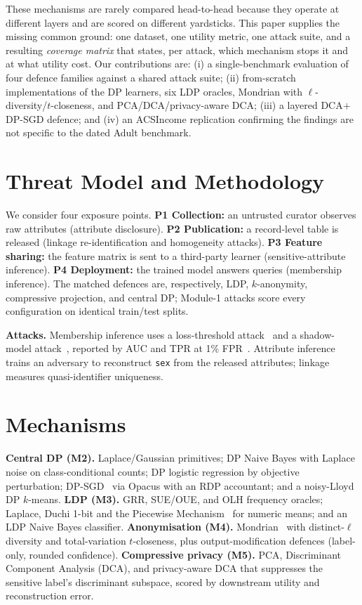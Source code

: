 \documentclass[conference]{IEEEtran}
\begin{document}
These mechanisms are rarely compared head-to-head because they operate at
different layers and are scored on different yardsticks. This paper supplies the
missing common ground: one dataset, one utility metric, one attack suite, and a
resulting \emph{coverage matrix} that states, per attack, which mechanism stops
it and at what utility cost. Our contributions are: (i) a single-benchmark
evaluation of four defence families against a shared attack suite; (ii) from-scratch
implementations of the DP learners, six LDP oracles, Mondrian with
$\ell$-diversity/$t$-closeness, and PCA/DCA/privacy-aware DCA; (iii) a layered
DCA$+$DP-SGD defence; and (iv) an ACSIncome replication confirming the findings
are not specific to the dated Adult benchmark.

\section{Threat Model and Methodology}
We consider four exposure points. \textbf{P1 Collection:} an untrusted curator
observes raw attributes (attribute disclosure). \textbf{P2 Publication:} a
record-level table is released (linkage re-identification and homogeneity
attacks). \textbf{P3 Feature sharing:} the feature matrix is sent to a
third-party learner (sensitive-attribute inference). \textbf{P4 Deployment:} the
trained model answers queries (membership inference). The matched defences are,
respectively, LDP, $k$-anonymity, compressive projection, and central DP;
Module-1 attacks score every configuration on identical train/test splits.

\textbf{Attacks.} Membership inference uses a loss-threshold
attack~\cite{yeom2018privacy} and a shadow-model attack~\cite{shokri2017membership},
reported by AUC and TPR at 1\% FPR~\cite{carlini2022membership}. Attribute
inference trains an adversary to reconstruct \texttt{sex} from the released
attributes; linkage measures quasi-identifier uniqueness.

\section{Mechanisms}
\textbf{Central DP (M2).} Laplace/Gaussian primitives; DP Naive Bayes with
Laplace noise on class-conditional counts; DP logistic regression by objective
perturbation; DP-SGD~\cite{abadi2016deep} via Opacus with an RDP accountant; and
a noisy-Lloyd DP $k$-means.
\textbf{LDP (M3).} GRR, SUE/OUE, and OLH frequency oracles; Laplace, Duchi 1-bit
and the Piecewise Mechanism~\cite{wang2019collecting} for numeric means; and an
LDP Naive Bayes classifier.
\textbf{Anonymisation (M4).} Mondrian~\cite{lefevre2006mondrian} with distinct-$\ell$
diversity and total-variation $t$-closeness, plus output-modification defences
(label-only, rounded confidence).
\textbf{Compressive privacy (M5).} PCA, Discriminant Component Analysis (DCA),
and privacy-aware DCA that suppresses the sensitive label's discriminant
subspace, scored by downstream utility and reconstruction error.
\end{document}
